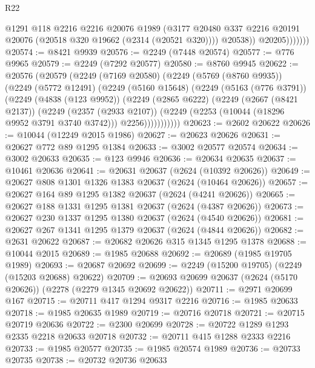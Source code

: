 \begin{lexlean}{R22}
\begin{coremodule}
                      @1291
                      @118
                      @2216
                      @2216
                      @20076
                      @1989
                      (@3177
                        @20480
                        @337
                        @2216
                        @20191
                        @20076
                        (@20518 @320 @19662 (@2314 (@20521 @320))))
                      @20538))
                  @20205)))))))
@20574 := @8421 @9939
@20576 := @2249 (@7448 @20574)
@20577 := @776 @9965
@20579 := @2249 (@7292 @20577)
@20580 := @8760 @9945
@20622 := @20576
    (@20579
      (@2249
        (@7169 @20580)
        (@2249
          (@5769 (@8760 @9935))
          (@2249
            (@5772 @12491)
            (@2249
              (@5160 @15648)
              (@2249
                (@5163 (@776 @3791))
                (@2249
                  (@4838 (@123 @9952))
                  (@2249
                    (@2865 @6222)
                    (@2249
                      (@2667 (@8421 @2137))
                      (@2249
                        (@2357 (@2933 @2107))
                        (@2249 (@2253 (@10044 (@18296 @9952 @3791 @3740 @3742))) @2256)))))))))))
@20623 := @2602 @20622
@20626 := @10044 (@12249 @2015 @1986)
@20627 := @20623 @20626
@20631 := @20627 @772 @89 @1295 @1384
@20633 := @3002 @20577 @20574
@20634 := @3002 @20633
@20635 := @123 @9946
@20636 := @20634 @20635
@20637 := @10461 @20636
@20641 := @20631 @20637 (@2624 (@10392 @20626))
@20649 := @20627 @808 @1301 @1326 @1383 @20637 (@2624 (@10464 @20626))
@20657 := @20627 @164 @89 @1295 @1382 @20637 (@2624 (@4241 @20626))
@20665 := @20627 @188 @1331 @1295 @1381 @20637 (@2624 (@4387 @20626))
@20673 := @20627 @230 @1337 @1295 @1380 @20637 (@2624 (@4540 @20626))
@20681 := @20627 @267 @1341 @1295 @1379 @20637 (@2624 (@4844 @20626))
@20682 := @2631 @20622
@20687 := @20682 @20626 @315 @1345 @1295 @1378
@20688 := @10044 @2015
@20689 := @1985 @20688
@20692 := @20689 (@1985 @19705 @1989)
@20693 := @20687 @20692
@20699 := @2249 (@15200 @19705) (@2249 (@15203 @20688) @20622)
@20709 := @20693 @20699 @20637 (@2624 (@5170 @20626)) (@2278 (@2279 @1345 @20692 @20622))
@20711 := @2971 @20699 @167
@20715 := @20711 @417 @1294 @9317 @2216
@20716 := @1985 @20633
@20718 := @1985 @20635 @1989
@20719 := @20716 @20718
@20721 := @20715 @20719 @20636
@20722 := @2300 @20699
@20728 := @20722 @1289 @1293 @2335 @2218 @20633 @20718
@20732 := @20711 @415 @1288 @2333 @2216
@20733 := @1985 @20577
@20735 := @1985 @20574 @1989
@20736 := @20733 @20735
@20738 := @20732 @20736 @20633

\end{coremodule}
\end{lexlean}
